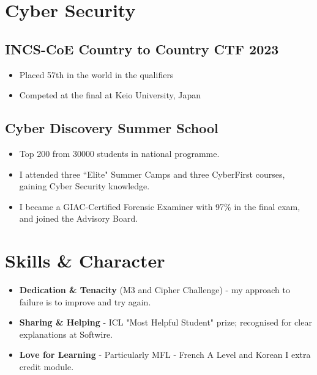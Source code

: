 \documentclass{Resume}
\begin{document}
    \section{Cyber Security}
            \subsection{INCS-CoE Country to Country CTF 2023}
            \begin{itemize}
                \item Placed 57th in the world in the qualifiers
                \item Competed at the final at Keio University, Japan
            \end{itemize}
		\subsection{Cyber Discovery Summer School}
				\begin{itemize}
				    \item Top 200 from 30000 students in national programme.
				    \item I attended three ``Elite" Summer Camps and three CyberFirst courses, gaining Cyber Security knowledge.
				    \item I became a GIAC-Certified Forensic Examiner with 97\% in the final exam, and joined the Advisory Board.
				\end{itemize}

    \section{Skills \& Character}
        \begin{itemize}
            \item \textbf{Dedication \& Tenacity} (M3 and Cipher Challenge) - my approach to failure is to improve and try again.
            \item \textbf{Sharing \& Helping} - ICL "Most Helpful Student" prize; recognised for clear explanations at Softwire.
            \item \textbf{Love for Learning} - Particularly MFL - French A Level and Korean I extra credit module.
        \end{itemize}
        
\end{document}
